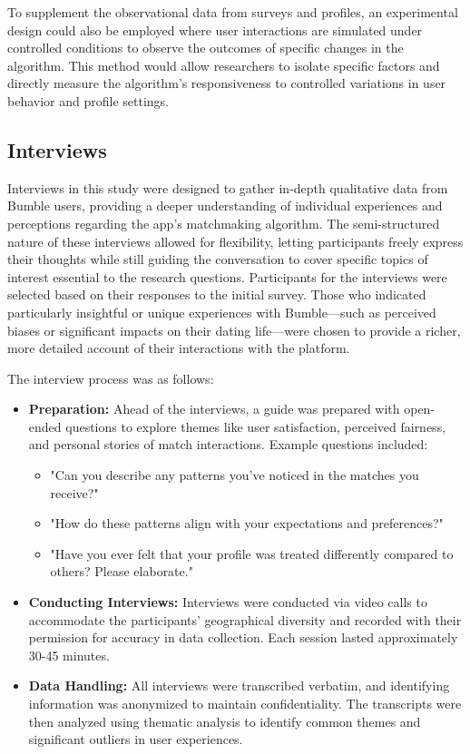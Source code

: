 To supplement the observational data from surveys and profiles, an experimental design could also be employed where user interactions are simulated under controlled conditions to observe the outcomes of specific changes in the algorithm. This method would allow researchers to isolate specific factors and directly measure the algorithm’s responsiveness to controlled variations in user behavior and profile settings.

\subsection{Interviews}
Interviews in this study were designed to gather in-depth qualitative data from Bumble users, providing a deeper understanding of individual experiences and perceptions regarding the app's matchmaking algorithm. The semi-structured nature of these interviews allowed for flexibility, letting participants freely express their thoughts while still guiding the conversation to cover specific topics of interest essential to the research questions. Participants for the interviews were selected based on their responses to the initial survey. Those who indicated particularly insightful or unique experiences with Bumble—such as perceived biases or significant impacts on their dating life—were chosen to provide a richer, more detailed account of their interactions with the platform.

The interview process was as follows:
\begin{itemize}
    \item \textbf{Preparation:} Ahead of the interviews, a guide was prepared with open-ended questions to explore themes like user satisfaction, perceived fairness, and personal stories of match interactions. Example questions included:
    \begin{itemize}
        \item "Can you describe any patterns you've noticed in the matches you receive?"
        \item "How do these patterns align with your expectations and preferences?"
        \item "Have you ever felt that your profile was treated differently compared to others? Please elaborate."
    \end{itemize}
    \item \textbf{Conducting Interviews:} Interviews were conducted via video calls to accommodate the participants' geographical diversity and recorded with their permission for accuracy in data collection. Each session lasted approximately 30-45 minutes.
    \item \textbf{Data Handling:} All interviews were transcribed verbatim, and identifying information was anonymized to maintain confidentiality. The transcripts were then analyzed using thematic analysis to identify common themes and significant outliers in user experiences.
\end{itemize}

